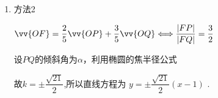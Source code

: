 \begin{enumerate}
\begin{jieda}
\begin{enumerate}
            若 ${x}_{1} = \dfrac{4{k}^{2} + 6\sqrt{{k}^{2} + 1}}{4{k}^{2} + 3},{x}_{2} = \dfrac{4{k}^{2} - 6\sqrt{{k}^{2} + 1}}{4{k}^{2} + 3}$，将其代入 $2{x}_{1} + 3{x}_{2} = 5$ 中得 $2 \times  \dfrac{4{k}^{2} + 6\sqrt{{k}^{2} + 1}}{4{k}^{2} + 3} + 3 \times  \dfrac{4{k}^{2} - 6\sqrt{{k}^{2} + 1}}{4{k}^{2} + 3} = 5$ ,化简得 $- 2\sqrt{{k}^{2} + 1} = 5$ ,无解.
            
            若 ${x}_{1} = \dfrac{4{k}^{2} - 6\sqrt{{k}^{2} + 1}}{4{k}^{2} + 3},{x}_{2} = \dfrac{4{k}^{2} + 6\sqrt{{k}^{2} + 1}}{4{k}^{2} + 3}$ ,
            
            将其代入 $2{x}_{1} + 3{x}_{2} = 5$ 中得$2 \times  \dfrac{4{k}^{2} - 6\sqrt{{k}^{2} + 1}}{4{k}^{2} + 3} + 3 \times  \dfrac{4{k}^{2} + 6\sqrt{{k}^{2} + 1}}{4{k}^{2} + 3} = 5$ ,化简得 $2\sqrt{{k}^{2} + 1} = 5$
            
            解得 $k =  \pm  \dfrac{\sqrt{21}}{2}$ ,所以直线方程为 $y =  \pm  \dfrac{\sqrt{21}}{2}\left( {x - 1}\right)$ .

            \item 方法2

            $\vv{OF} = \dfrac{2}{5}\vv{OP} + \dfrac{3}{5}\vv{OQ} \Longleftrightarrow \dfrac{|FP|}{|FQ|} = \dfrac{3}{2}$

            设$PQ$的倾斜角为$\alpha$，利用椭圆的焦半径公式
            故$k = \pm \dfrac{\sqrt{21}}{2}$,所以直线方程为 $y =  \pm  \dfrac{\sqrt{21}}{2}\left( {x - 1}\right)$ .


\end{enumerate}
\end{jieda}
\end{enumerate}
